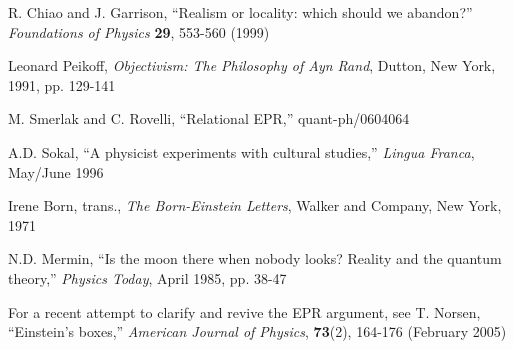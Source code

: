 \documentclass[12pt]{article}
\begin{document}
\begin{thebibliography}{00}
R. Chiao and J. Garrison, 
``Realism or locality: which should we abandon?'' \emph{Foundations of
  Physics} {\bf{29}}, 553-560 (1999)

 Leonard Peikoff,
  \emph{Objectivism: The Philosophy of Ayn Rand}, Dutton, New York,
1991, pp. 129-141


M. Smerlak and C. Rovelli, ``Relational EPR,'' quant-ph/0604064

A.D. Sokal, ``A physicist experiments with cultural studies,''
\emph{Lingua Franca}, May/June 1996

Irene Born, trans., \emph{The Born-Einstein Letters}, Walker and
Company, New York, 1971


N.D. Mermin, ``Is the moon there when nobody looks? Reality and the
quantum theory,'' \emph{Physics Today}, April 1985, pp. 38-47


For a recent attempt to clarify and revive the EPR argument, see
T. Norsen, ``Einstein's boxes,'' \emph{American Journal of Physics}, 
{\bf{73}}(2), 164-176 (February 2005)


\end{thebibliography}
\end{document}
